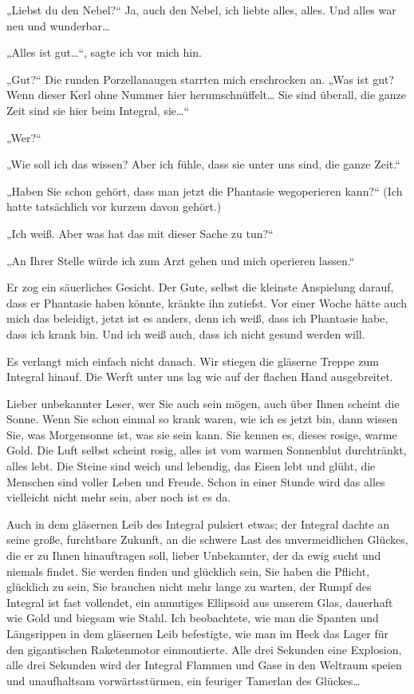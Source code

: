 „Liebst du den Nebel?“ Ja, auch den Nebel, ich liebte alles, alles.
Und alles war neu und wunderbar\ldots{}

„Alles ist gut\ldots{}“, sagte ich vor mich hin.

„Gut?“ Die runden Porzellanaugen starrten mich
erschrocken an. „Was ist gut? Wenn dieser Kerl ohne Nummer hier
herumschnüffelt\ldots{} Sie sind überall, die ganze Zeit sind sie hier
beim Integral, sie\ldots{}“

„Wer?“

„Wie soll ich das wissen? Aber ich fühle, dass sie unter uns sind,
die ganze Zeit.“

„Haben Sie schon gehört, dass man jetzt die Phantasie wegoperieren
kann?“ (Ich hatte tatsächlich vor kurzem davon gehört.)

„Ich weiß. Aber was hat das mit dieser Sache zu tun?“

„An Ihrer Stelle würde ich zum Arzt gehen und mich operieren lassen.“

Er zog ein säuerliches Gesicht. Der Gute, selbst die kleinste
Anspielung darauf, dass er Phantasie haben könnte, kränkte ihn
zutiefst. Vor einer Woche hätte auch mich das beleidigt, jetzt ist
es anders, denn ich weiß, dass ich
Phantasie habe, dass ich krank bin. Und ich weiß auch, dass ich
nicht gesund werden will.

Es verlangt mich einfach nicht danach. Wir stiegen die gläserne
Treppe zum Integral hinauf. Die Werft unter uns lag wie auf der
flachen Hand ausgebreitet.

Lieber unbekannter Leser, wer Sie auch
sein mögen, auch über Ihnen scheint die Sonne. Wenn Sie schon
einmal so krank waren, wie ich es jetzt bin, dann wissen Sie, was
Morgensonne ist, was sie sein kann. Sie kennen es, dieses rosige,
warme Gold. Die Luft selbst scheint rosig, alles ist vom warmen
Sonnenblut durchtränkt, alles lebt. Die Steine sind weich und
lebendig, das Eisen lebt und glüht, die Menschen sind voller Leben
und Freude. Schon in einer Stunde wird das alles vielleicht nicht
mehr sein, aber noch ist es da.

Auch in dem gläsernen Leib des Integral pulsiert etwas; der
Integral dachte an seine große, furchtbare Zukunft, an die schwere
Last des unvermeidlichen Glückes, die er zu Ihnen hinauftragen
soll, lieber Unbekannter, der da ewig sucht und niemals findet. Sie
werden finden und glücklich sein, Sie haben die Pflicht, glücklich
zu sein, Sie brauchen nicht mehr lange zu warten, der Rumpf des
Integral ist fast vollendet, ein anmutiges Ellipsoid aus unserem
Glas, dauerhaft wie Gold und biegsam wie Stahl. Ich beobachtete,
wie man die Spanten und Längsrippen in dem gläsernen Leib
befestigte, wie man im Heck das Lager für den gigantischen
Raketenmotor einmontierte. Alle drei Sekunden eine Explosion, alle
drei Sekunden wird der Integral Flammen und Gase in den Weltraum
speien und unaufhaltsam vorwärtsstürmen, ein feuriger Tamerlan des
Glückes\ldots{}

